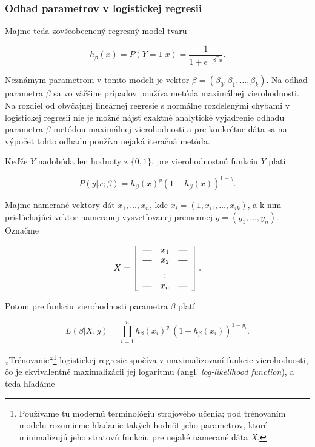 \subsubsection{Odhad parametrov v logistickej regresii}

Majme teda zovšeobecnený regresný model tvaru

\[
h_\beta(x) = P(Y = 1|x) = \frac{1}{1 + e^{-\beta^T x}}.
\]

Neznámym parametrom v tomto modeli je vektor \( \beta = (\beta_0, \beta_1, \ldots, \beta_k) \).
Na odhad parametra \( \beta \) sa vo väčšine prípadov používa metóda maximálnej vierohodnosti.
Na rozdiel od obyčajnej lineárnej regresie s normálne rozdelenými chybami
v logistickej regresii nie je možné nájsť exaktné analytické vyjadrenie odhadu parametra \( \beta \) metódou maximálnej vierohodnosti
a pre konkrétne dáta sa na výpočet tohto odhadu používa nejaká iteračná metóda.

Keďže \(Y\) nadobúda len hodnoty z \( \{0, 1\} \), pre vierohodnostnú funkciu \(Y\) platí:

\[
P(y | x; \beta ) = h_\beta(x)^y (1 - h_\beta(x))^{1 - y}.
\]

Majme namerané vektory dát \( x_1, \ldots, x_n \), kde \( x_i = (1, x_{i1}, \ldots, x_{ik}) \),
a k nim prislúchajúci vektor nameranej vysvetľovanej premennej \(y = (y_1, \ldots, y_n )\). Označme

\[
    X =
    \left[
        \begin{array}{ccc}
            \horzbar & x_{1} & \horzbar \\
            \horzbar & x_{2} & \horzbar \\
                    & \vdots    &          \\
            \horzbar & x_{n} & \horzbar
        \end{array}
    \right].
\]


Potom pre funkciu vierohodnosti parametra \( \beta \) platí

\[
L(\beta | X, y) = \prod_{i = 1}^n h_\beta(x_i)^{y_i} (1 - h_\beta(x_i))^{1 - y_i}.
\]

„Trénovanie“\footnote{Používame tu modernú terminológiu strojového učenia; pod trénovaním  modelu rozumieme hľadanie takých hodnôt jeho parametrov, ktoré minimalizujú jeho stratovú funkciu pre nejaké namerané dáta \emph{X}.}
logistickej regresie spočíva v maximalizovaní funkcie vierohodnosti,
čo je ekvivalentné maximalizácii jej logaritmu (angl. \emph{log-likelihood function}), a teda hľadáme

